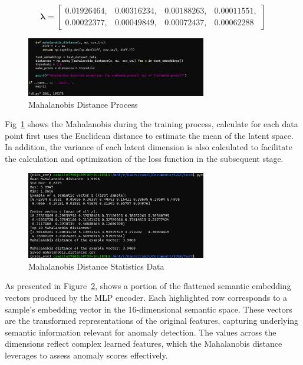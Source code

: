 \begin{ZhChapter}
    \[
        \boldsymbol{\lambda} =
        \begin{bmatrix}
            0.01926464, & 0.00316234, & 0.00188263, & 0.00011551, \\
            0.00022377, & 0.00049849, & 0.00072437, & 0.00062288
        \end{bmatrix}
    \]



    \begin{figure}[htbp]
        \centering
        \includegraphics[width = 0.7\textwidth]{image/3131.jpg}
        \caption{Mahalanobis Distance Process}
        \label{fig:3131}
    \end{figure}

    Fig~\ref{fig:3131} shows the Mahalanobis during the training process, calculate for each data point first uses the Euclidean distance to estimate the mean of the latent space. In addition, the variance of each latent dimension is also calculated to facilitate the calculation and optimization of the loss function in the subsequent stage.


    \begin{figure}[htbp]
        \centering
        \includegraphics[width = 0.7\textwidth]{image/mean.jpg}
        \caption{Mahalanobis Distance Statistics Data}
        \label{fig:mean}
    \end{figure}

    As presented in Figure~\ref{fig:mean}, shows a portion of the flattened semantic embedding vectors produced by the MLP encoder. Each highlighted row corresponds to a sample's embedding vector in the 16-dimensional semantic space. These vectors are the transformed representations of the original features, capturing underlying semantic information relevant for anomaly detection. The values across the dimensions reflect complex learned features, which the Mahalanobis distance leverages to assess anomaly scores effectively.



\end{ZhChapter}
